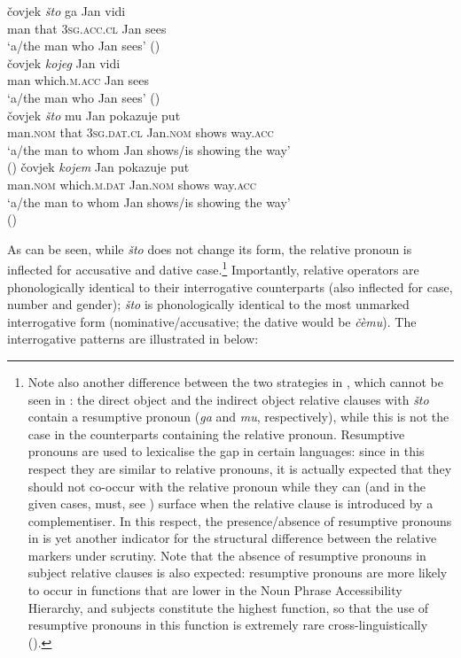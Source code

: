 \documentclass[output=paper]{langscibook}
\begin{document}
\ea \label{bacsk:ex:doio}
\ea \gll čovjek \textit{što} ga Jan vidi \label{bacsk:ex:scobjectsto}\\
man that \textsc{3sg.acc.cl} Jan sees\\
\glt `a/the man who Jan sees' \hfill (\citealt[27]{gracaninyuksek2013})\\
\ex \gll čovjek \textit{kojeg} Jan vidi \label{bacsk:ex:scobjectkojeg}\\
man which.\textsc{m.acc} Jan sees\\
\glt `a/the man who Jan sees' \hfill (\citealt[27]{gracaninyuksek2013})\\
\ex \gll čovjek \textit{što} mu Jan pokazuje put \label{bacsk:ex:scindobjectsto}\\
man.\textsc{nom} that \textsc{3sg.dat.cl} Jan.\textsc{nom} shows way.\textsc{acc}\\
\glt `a/the man to whom Jan shows/is showing the way'\\\hfill (\citealt[27]{gracaninyuksek2013})
\ex \gll čovjek \textit{kojem} Jan pokazuje put \label{bacsk:ex:scindobjectkojem}\\
man.\textsc{nom} which.\textsc{m.dat} Jan.\textsc{nom} shows way.\textsc{acc}\\
\glt `a/the man to whom Jan shows/is showing the way'\\\hfill (\citealt[27]{gracaninyuksek2013})
\z
\z

\noindent As can be seen, while \textit{što} does not change its form, the relative pronoun is inflected for accusative and dative case.\footnote{Note also another difference between the two strategies in , which cannot be seen in : the direct object and the indirect object relative clauses with \textit{što} contain a resumptive pronoun (\textit{ga} and \textit{mu}, respectively), while this is not the case in the counterparts containing the relative pronoun. Resumptive pronouns are used to lexicalise the gap in certain languages: since in this respect they are similar to relative pronouns, it is actually expected that they should not co-occur with the relative pronoun while they can (and in the given cases, must, see \citealt[27]{gracaninyuksek2013}) surface when the relative clause is introduced by a complementiser. In this respect, the presence/absence of resumptive pronouns in  is yet another indicator for the structural difference between the relative markers under scrutiny. Note that the absence of resumptive pronouns in subject relative clauses is also expected: resumptive pronouns are more likely to occur in functions that are lower in the Noun Phrase Accessibility Hierarchy, and subjects constitute the highest function, so that the use of resumptive pronouns in this function is extremely rare cross-linguistically (\citealt{keenancomrie1977}).} Importantly, relative operators are phonologically identical to their interrogative counterparts (also inflected for case, number and gender); \textit{što} is phonologically identical to the most unmarked interrogative form (nominative/accusative; the dative would be \textit{čèmu}). The interrogative patterns are illustrated in  below:
\end{document}
